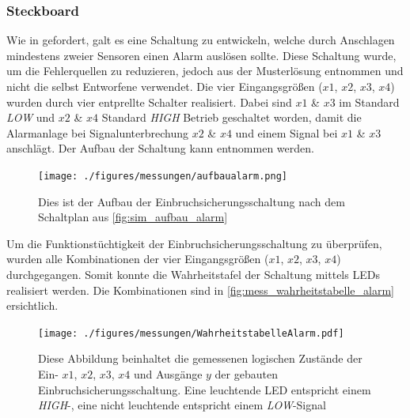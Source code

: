 \documentclass[12pt,english,ngerman]{scrartcl}
\begin{document}
\subsubsection{Steckboard}
Wie in  gefordert, galt es eine Schaltung
zu entwickeln, welche durch Anschlagen mindestens zweier Sensoren einen Alarm auslösen
sollte. Diese Schaltung wurde, um die Fehlerquellen zu reduzieren, jedoch aus der
Musterlösung entnommen und nicht die selbst Entworfene verwendet. Die vier
Eingangsgrößen ($x1$, $x2$, $x3$, $x4$) wurden durch vier entprellte
Schalter realisiert. Dabei sind $x1$ \& $x3$ im Standard \textit{LOW} und
$x2$ \& $x4$ Standard \textit{HIGH} Betrieb geschaltet worden, damit die
Alarmanlage bei Signalunterbrechung $x2$ \& $x4$ und einem Signal bei $x1$
\& $x3$ anschlägt. Der Aufbau der Schaltung kann 
entnommen werden.

\begin{figure}[H]
  \centering
    \texttt{[image: ./figures/messungen/aufbaualarm.png]}
  \caption{Dies ist der Aufbau der Einbruchsicherungsschaltung nach dem
  Schaltplan aus \autoref{fig:sim_aufbau_alarm}}
  \label{fig:mess_aufbau_alarm}
\end{figure}

Um die Funktionstüchtigkeit der Einbruchsicherungsschaltung zu überprüfen,
wurden alle Kombinationen der vier Eingangsgrößen ($x1$, $x2$, $x3$, $x4$)
durchgegangen. Somit konnte die Wahrheitstafel der Schaltung mittels LEDs realisiert werden.
Die Kombinationen sind in \autoref{fig:mess_wahrheitstabelle_alarm}
ersichtlich.

\begin{figure}[H]
  \centering
    \texttt{[image: ./figures/messungen/WahrheitstabelleAlarm.pdf]}
  \caption{Diese Abbildung beinhaltet die gemessenen logischen Zustände der
    Ein- $x1$, $x2$, $x3$, $x4$ und Ausgänge $y$ der gebauten
    Einbruchsicherungsschaltung. Eine leuchtende LED entspricht einem
    \textit{HIGH}-, eine nicht leuchtende entspricht einem \textit{LOW}-Signal}
  \label{fig:mess_wahrheitstabelle_alarm}
\end{figure}
\end{document}
